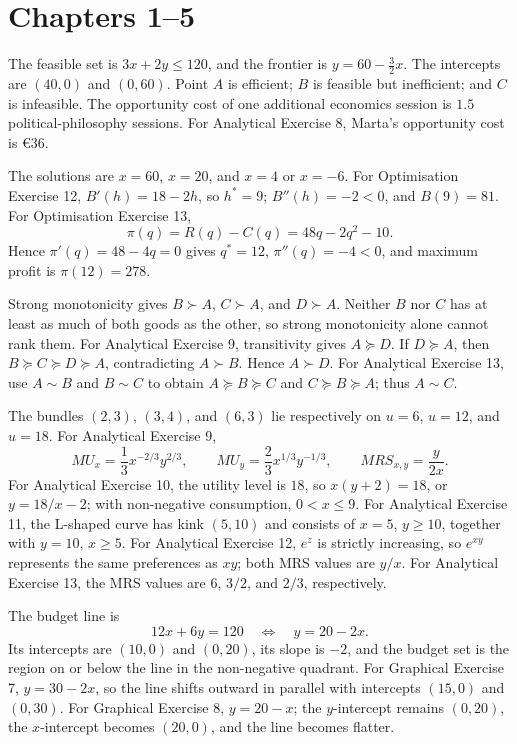 \section{Chapters 1--5}

\begin{description}[style=nextline,leftmargin=0pt,labelsep=0pt,font=\sffamily\bfseries]
  \item[Chapter 1, Graphical Exercise 6.] The feasible set is $3x+2y\leq120$, and the frontier is $y=60-\frac{3}{2}x$. The intercepts are $(40,0)$ and $(0,60)$. Point $A$ is efficient; $B$ is feasible but inefficient; and $C$ is infeasible. The opportunity cost of one additional economics session is $1.5$ political-philosophy sessions. For Analytical Exercise 8, Marta's opportunity cost is \euro36.
  \item[Chapter 2, Analytical Exercise 8.] The solutions are $x=60$, $x=20$, and $x=4$ or $x=-6$. For Optimisation Exercise 12, $B'(h)=18-2h$, so $h^*=9$; $B''(h)=-2<0$, and $B(9)=81$. For Optimisation Exercise 13,
  \[
  \pi(q)=R(q)-C(q)=48q-2q^2-10.
  \]
  Hence $\pi'(q)=48-4q=0$ gives $q^*=12$, $\pi''(q)=-4<0$, and maximum profit is $\pi(12)=278$.
  \item[Chapter 3, Graphical Exercise 6.] Strong monotonicity gives $B\succ A$, $C\succ A$, and $D\succ A$. Neither $B$ nor $C$ has at least as much of both goods as the other, so strong monotonicity alone cannot rank them. For Analytical Exercise 9, transitivity gives $A\succeq D$. If $D\succeq A$, then $B\succeq C\succeq D\succeq A$, contradicting $A\succ B$. Hence $A\succ D$. For Analytical Exercise 13, use $A\sim B$ and $B\sim C$ to obtain $A\succeq B\succeq C$ and $C\succeq B\succeq A$; thus $A\sim C$.
  \item[Chapter 4, Graphical Exercise 6.] The bundles $(2,3)$, $(3,4)$, and $(6,3)$ lie respectively on $u=6$, $u=12$, and $u=18$. For Analytical Exercise 9,
  \[
  MU_x=\frac{1}{3}x^{-2/3}y^{2/3},
  \qquad
  MU_y=\frac{2}{3}x^{1/3}y^{-1/3},
  \qquad
  MRS_{x,y}=\frac{y}{2x}.
  \]
  For Analytical Exercise 10, the utility level is $18$, so $x(y+2)=18$, or $y=18/x-2$; with non-negative consumption, $0<x\leq9$. For Analytical Exercise 11, the L-shaped curve has kink $(5,10)$ and consists of $x=5$, $y\geq10$, together with $y=10$, $x\geq5$. For Analytical Exercise 12, $e^z$ is strictly increasing, so $e^{xy}$ represents the same preferences as $xy$; both MRS values are $y/x$. For Analytical Exercise 13, the MRS values are $6$, $3/2$, and $2/3$, respectively.
  \item[Chapter 5, Graphical Exercise 6.] The budget line is
  \[
  12x+6y=120
  \quad\Longleftrightarrow\quad
  y=20-2x.
  \]
  Its intercepts are $(10,0)$ and $(0,20)$, its slope is $-2$, and the budget set is the region on or below the line in the non-negative quadrant. For Graphical Exercise 7, $y=30-2x$, so the line shifts outward in parallel with intercepts $(15,0)$ and $(0,30)$. For Graphical Exercise 8, $y=20-x$; the $y$-intercept remains $(0,20)$, the $x$-intercept becomes $(20,0)$, and the line becomes flatter.


\end{description}
